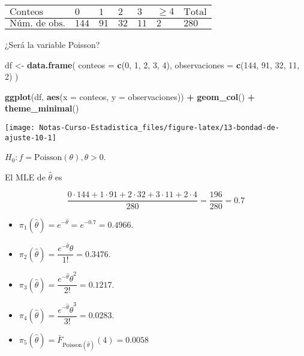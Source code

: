 \documentclass[
  12pt,
]{book}
\newenvironment{Shaded}{\begin{snugshade}}{\end{snugshade}}
\newcommand{\DataTypeTok}[1]{\textcolor[rgb]{0.13,0.29,0.53}{#1}}
\newcommand{\DecValTok}[1]{\textcolor[rgb]{0.00,0.00,0.81}{#1}}
\newcommand{\KeywordTok}[1]{\textcolor[rgb]{0.13,0.29,0.53}{\textbf{#1}}}
\newcommand{\NormalTok}[1]{#1}
\newcommand{\OperatorTok}[1]{\textcolor[rgb]{0.81,0.36,0.00}{\textbf{#1}}}
\newcommand{\StringTok}[1]{\textcolor[rgb]{0.31,0.60,0.02}{#1}}
\begin{document}
\begin{longtable}[]{@{}lllllll@{}}
\toprule
\(\text{Conteos}\) & \(0\) & \(1\) & \(2\) & \(3\) & \(\ge 4\) & \(\text{Total}\)\tabularnewline
\midrule
\endhead
\(\text{Núm. de obs.}\) & \(144\) & \(91\) & \(32\) & \(11\) & \(2\) & \(280\)\tabularnewline
\bottomrule
\end{longtable}

¿Será la variable Poisson?

\begin{Shaded}
\begin{Highlighting}[]
\NormalTok{df \textless{}{-}}\StringTok{ }\KeywordTok{data.frame}\NormalTok{(}
  \DataTypeTok{conteos =} \KeywordTok{c}\NormalTok{(}\DecValTok{0}\NormalTok{, }\DecValTok{1}\NormalTok{, }\DecValTok{2}\NormalTok{, }\DecValTok{3}\NormalTok{, }\DecValTok{4}\NormalTok{),}
  \DataTypeTok{observaciones =} \KeywordTok{c}\NormalTok{(}\DecValTok{144}\NormalTok{, }\DecValTok{91}\NormalTok{, }\DecValTok{32}\NormalTok{, }\DecValTok{11}\NormalTok{, }\DecValTok{2}\NormalTok{)}
\NormalTok{)}

\KeywordTok{ggplot}\NormalTok{(df, }\KeywordTok{aes}\NormalTok{(}\DataTypeTok{x =}\NormalTok{ conteos, }\DataTypeTok{y =}\NormalTok{ observaciones)) }\OperatorTok{+}
\StringTok{  }\KeywordTok{geom\_col}\NormalTok{() }\OperatorTok{+}
\StringTok{  }\KeywordTok{theme\_minimal}\NormalTok{()}
\end{Highlighting}
\end{Shaded}

\begin{center}\texttt{[image: Notas-Curso-Estadistica\_files/figure-latex/13-bondad-de-ajuste-10-1]} \end{center}

\(H_0: f = \text{Poisson}(\theta), \theta>0\).

El MLE de \(\hat\theta\) es

\[\dfrac{0\cdot 144+1\cdot91+2\cdot32+3\cdot 11+2\cdot4}{280} = \dfrac{196}{280} = 0.7\]

\begin{itemize}
\item
  \(\pi_1(\hat\theta) = e^{-\hat\theta} = e^{-0.7}=0.4966\).
\item
  \(\pi_2(\hat\theta) = \dfrac{e^{-\hat\theta}\hat\theta}{1!} = 0.3476\).
\item
  \(\pi_3(\hat\theta) = \dfrac{e^{-\hat\theta}\hat\theta^2}{2!} = 0.1217\).
\item
  \(\pi_4(\hat\theta) = \dfrac{e^{-\hat\theta}\hat\theta^3}{3!} = 0.0283\).
\item
  \(\pi_5(\hat\theta) = \bar F_{\text{Poisson}(\hat\theta)}(4) = 0.0058\)
\end{itemize}
\end{document}
